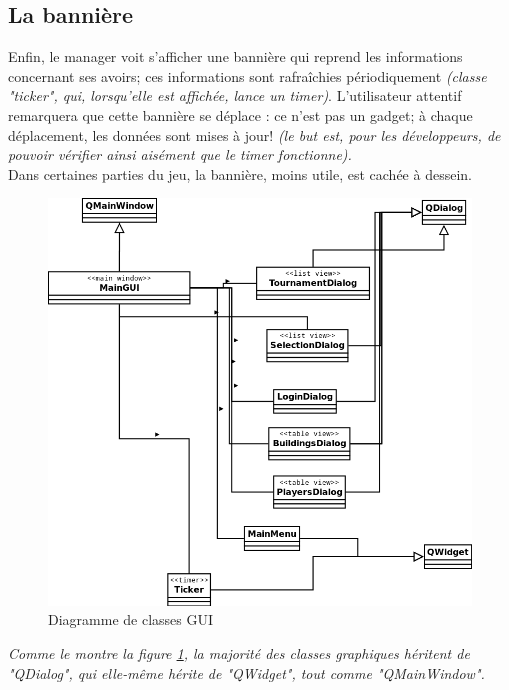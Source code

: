\documentclass[a4paper,titlepage]{scrreprt}
\begin{document}
\subsection{La bannière}
Enfin, le manager voit s'afficher une bannière qui reprend les informations concernant ses avoirs;
ces informations sont rafraîchies périodiquement
\emph{(classe "ticker", qui, lorsqu'elle est affichée, lance un timer\cite{Blanchette2006})}.
L'utilisateur attentif remarquera que cette bannière se déplace : ce n'est pas un gadget;
à chaque déplacement, les données sont mises à jour!
\emph{(le but est, pour les développeurs, de pouvoir vérifier ainsi aisément que le timer fonctionne).}\\
Dans certaines parties du jeu, la bannière, moins utile, est cachée à dessein.
    \begin{figure}[H]
    \center
    \includegraphics[scale=0.4]{uml/class/generalGUI.png}
    \caption{Diagramme de classes GUI} \label{generalGUI}
    \end{figure}
\emph{Comme le montre la figure \ref{generalGUI}, la majorité des classes graphiques héritent de "QDialog",
qui elle-même hérite de "QWidget", tout comme "QMainWindow".}
\end{document}
